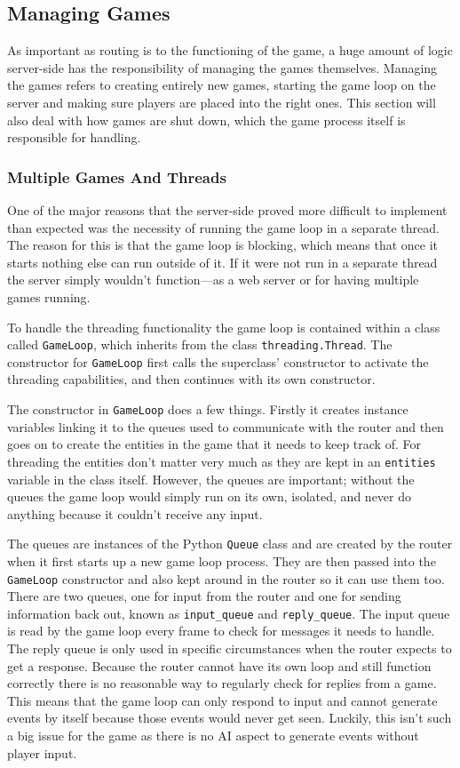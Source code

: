 \subsection{Managing Games}\label{managing_games}
As important as routing is to the functioning of the game, a huge amount of logic server-side has the responsibility of managing the games themselves. Managing the games refers to creating entirely new games, starting the game loop on the server and making sure players are placed into the right ones. This section will also deal with how games are shut down, which the game process itself is responsible for handling.

\subsubsection{Multiple Games And Threads}
One of the major reasons that the server-side proved more difficult to implement than expected was the necessity of running the game loop in a separate thread. The reason for this is that the game loop is blocking, which means that once it starts nothing else can run outside of it. If it were not run in a separate thread the server simply wouldn't function---as a web server or for having multiple games running.

To handle the threading functionality the game loop is contained within a class called \texttt{GameLoop}, which inherits from the class \texttt{threading.Thread}. The constructor for \texttt{GameLoop} first calls the superclass' constructor to activate the threading capabilities, and then continues with its own constructor.

The constructor in \texttt{GameLoop} does a few things. Firstly it creates instance variables linking it to the queues used to communicate with the router and then goes on to create the entities in the game that it needs to keep track of. For threading the entities don't matter very much as they are kept in an \texttt{entities} variable in the class itself. However, the queues are important; without the queues the game loop would simply run on its own, isolated, and never do anything because it couldn't receive any input.

The queues are instances of the Python \texttt{Queue} class and are created by the router when it first starts up a new game loop process. They are then passed into the \texttt{GameLoop} constructor and also kept around in the router so it can use them too. There are two queues, one for input from the router and one for sending information back out, known as \texttt{input\_queue} and \texttt{reply\_queue}. The input queue is read by the game loop every frame to check for messages it needs to handle. The reply queue is only used in specific circumstances when the router expects to get a response. Because the router cannot have its own loop and still function correctly there is no reasonable way to regularly check for replies from a game. This means that the game loop can only respond to input and cannot generate events by itself because those events would never get seen. Luckily, this isn't such a big issue for the game as there is no AI aspect to generate events without player input.

